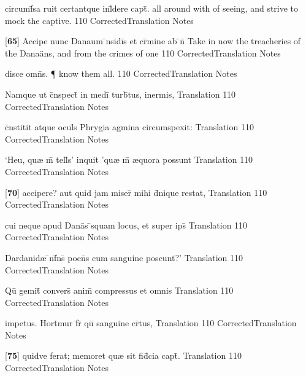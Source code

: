 \latline
  {circumf\={}sa ruit certantque inl\={}dere capt\={}.}
  { all around with of seeing, and strive to mock the captive. }
  {110}
  { CorrectedTranslation }
  { Notes }


\latline
  {[\textbf{65}] Accipe nunc Danaum \={\macron {\i}}nsidi\={}s et cr\={\macron {\i}}mine ab \={}n\={}}
  { Take in now the treacheries of the Dana\"ans, and from the crimes of one }
  {110}
  { CorrectedTranslation }
  { Notes }


\latline
  {disce omn\={\macron {\i}}s. \P}
  { know them all. }
  {110}
  { CorrectedTranslation }
  { Notes }


\latline
  {Namque ut c\={}nspect\={} in medi\={} turb\={}tus, inermis, }
  { Translation }
  {110}
  { CorrectedTranslation }
  { Notes }


\latline
  {c\={}nstitit atque ocul\={\macron {\i}}s Phrygia agmina circumspexit:}
  { Translation }
  {110}
  { CorrectedTranslation }
  { Notes }


\latline
  {`Heu, qu{\ae} m\={} tell\={}s' inquit 'qu{\ae} m\={} {\ae}quora possunt}
  { Translation }
  {110}
  { CorrectedTranslation }
  { Notes }


\latline
  {[\textbf{70}] accipere? aut quid jam miser\={} mihi d\={}nique restat,}
  { Translation }
  {110}
  { CorrectedTranslation }
  { Notes }


\latline
  {cui neque apud Dana\={}s \={}squam locus, et super ips\={\macron {\i}}}
  { Translation }
  {110}
  { CorrectedTranslation }
  { Notes }


\latline
  {Dardanid{\ae} \={\macron {\i}}nf\={}ns\={\macron {\i}} poen\={}s cum sanguine poscunt?'}
  { Translation }
  {110}
  { CorrectedTranslation }
  { Notes }


\latline
  {Qu\={} gemit\={} convers\={\macron {\i}} anim\={\macron {\i}} compressus et omnis}
  { Translation }
  {110}
  { CorrectedTranslation }
  { Notes }


\latline
  {impetus.  Hort\={}mur f\={}r\={\macron {\i}} qu\={} sanguine cr\={}tus,}
  { Translation }
  {110}
  { CorrectedTranslation }
  { Notes }


\latline
  {[\textbf{75}] quidve ferat; memoret qu{\ae} sit fid\={}cia capt\={}.}
  { Translation }
  {110}
  { CorrectedTranslation }
  { Notes }


